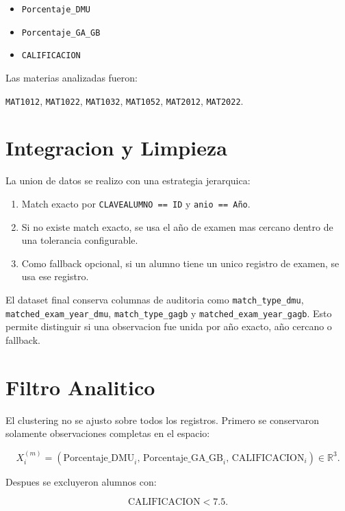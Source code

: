 \documentclass[11pt,letterpaper]{article}
\newcommand{\code}[1]{\texttt{#1}}
\begin{document}
\begin{itemize}
    \item \code{Porcentaje\_DMU}
    \item \code{Porcentaje\_GA\_GB}
    \item \code{CALIFICACION}
\end{itemize}

Las materias analizadas fueron:

\begin{center}
\code{MAT1012}, \code{MAT1022}, \code{MAT1032}, \code{MAT1052}, \code{MAT2012}, \code{MAT2022}.
\end{center}

\section{Integracion y Limpieza}

La union de datos se realizo con una estrategia jerarquica:

\begin{enumerate}
    \item Match exacto por \code{CLAVEALUMNO == ID} y \code{anio == Año}.
    \item Si no existe match exacto, se usa el año de examen mas cercano dentro de una tolerancia configurable.
    \item Como fallback opcional, si un alumno tiene un unico registro de examen, se usa ese registro.
\end{enumerate}

El dataset final conserva columnas de auditoria como \code{match\_type\_dmu}, \code{matched\_exam\_year\_dmu}, \code{match\_type\_gagb} y \code{matched\_exam\_year\_gagb}. Esto permite distinguir si una observacion fue unida por año exacto, año cercano o fallback.

\section{Filtro Analitico}

El clustering no se ajusto sobre todos los registros. Primero se conservaron solamente observaciones completas en el espacio:

\[
X_i^{(m)} =
\left(
\text{Porcentaje\_DMU}_i,\,
\text{Porcentaje\_GA\_GB}_i,\,
\text{CALIFICACION}_i
\right)
\in \mathbb{R}^3.
\]

Despues se excluyeron alumnos con:

\[
\text{CALIFICACION} < 7.5.
\]
\end{document}
